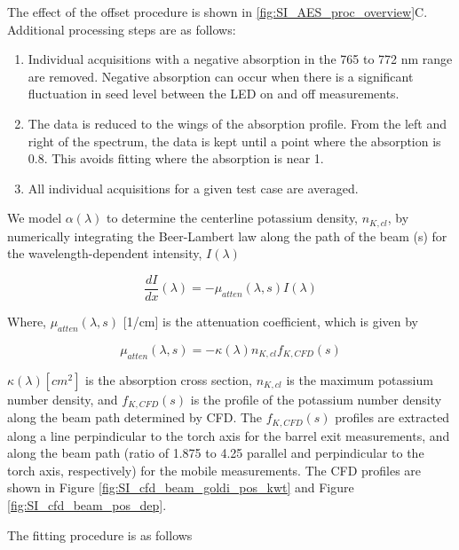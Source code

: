 The effect of the offset procedure is shown in \ref{fig:SI_AES_proc_overview}C. Additional processing steps are as follows:

\begin{enumerate}
    \item Individual acquisitions with a negative absorption in the 765 to 772 nm range are removed. Negative absorption can occur when there is a significant fluctuation in seed level between the LED on and off measurements.
    \item The data is reduced to the wings of the absorption profile. From the left and right of the spectrum, the data is kept until a point where the absorption is 0.8. This avoids fitting where the absorption is near 1. 
    \item All individual acquisitions for a given test case are averaged.
\end{enumerate}

We model $\alpha(\lambda)$ to determine the centerline potassium density, $n_{K, cl}$, by numerically integrating the Beer-Lambert law along the path of the beam (s) for the wavelength-dependent intensity, $I(\lambda)$

\begin{equation}
    \frac{dI}{dx}(\lambda) = -\mu_{atten}(\lambda, s) I(\lambda)
\end{equation}

Where, $\mu_{atten} (\lambda, s)$ [1/cm] is the attenuation coefficient, which is given by 

\begin{equation}
    \mu_{atten}(\lambda, s) = -\kappa(\lambda) n_{K,cl} f_{K, CFD}(s)
\end{equation}

$\kappa(\lambda) [cm^2]$ is the absorption cross section, $n_{K,cl}$ is the maximum potassium number density, and $f_{K, CFD}(s)$ is the profile of the potassium number density along the beam path determined by CFD. The $f_{K, CFD}(s)$ profiles are extracted along a line perpindicular to the torch axis for the barrel exit measurements, and along the beam path (ratio of 1.875 to 4.25 parallel and perpindicular to the torch axis, respectively) for the mobile measurements. The CFD profiles are shown in Figure \ref{fig:SI_cfd_beam_goldi_pos_kwt} and Figure \ref{fig:SI_cfd_beam_pos_dep}.

The fitting procedure is as follows


